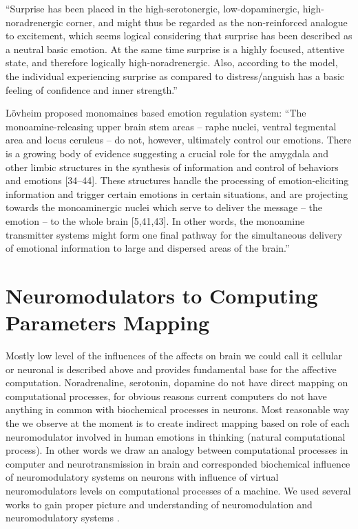 ``Surprise has been placed in the high-serotonergic, low-dopaminergic, high-noradrenergic corner, and might thus be regarded as the non-reinforced analogue to excitement, which seems logical considering that surprise has been described as a neutral basic emotion. At the same time surprise is a highly focused, attentive state, and therefore logically high-noradrenergic. Also, according to the model, the individual experiencing surprise as compared to distress/anguish has a basic feeling of confidence and inner strength.''

L\"{o}vheim proposed monomaines based emotion regulation system: ``The monoamine-releasing upper brain stem areas – raphe nuclei, ventral tegmental area and locus ceruleus – do not, however, ultimately control our emotions. There is a growing body of evidence suggesting a crucial role for the amygdala and other limbic structures in the synthesis of information and control of behaviors and emotions [34–44]. These structures handle the processing of emotion-eliciting information and trigger certain emotions in certain situations, and are projecting towards the monoaminergic nuclei which serve to deliver the message – the emotion – to the whole brain [5,41,43]. In other words, the monoamine transmitter systems might form one final pathway for the simultaneous delivery of emotional information to large and dispersed areas of the brain.''

\section{Neuromodulators to Computing Parameters Mapping}

Mostly low level of the influences of the affects on brain we could call it cellular or neuronal is described above and provides fundamental base for the affective computation. Noradrenaline, serotonin, dopamine do not have direct mapping on computational processes, for obvious reasons current computers do not have anything in common with biochemical processes in neurons. Most reasonable way the we observe at the moment is to create indirect mapping based on role of each neuromodulator involved in human emotions in thinking (natural computational process). In other words we draw an analogy between computational processes in computer and neurotransmission in brain and corresponded biochemical influence of neuromodulatory systems on neurons with influence of virtual neuromodulators levels on computational processes of a machine. We used several works to gain proper picture and understanding of neuromodulation and neuromodulatory systems \cite{cubeofemotions, neuromodulatory, on_role_of_emotion}. 

